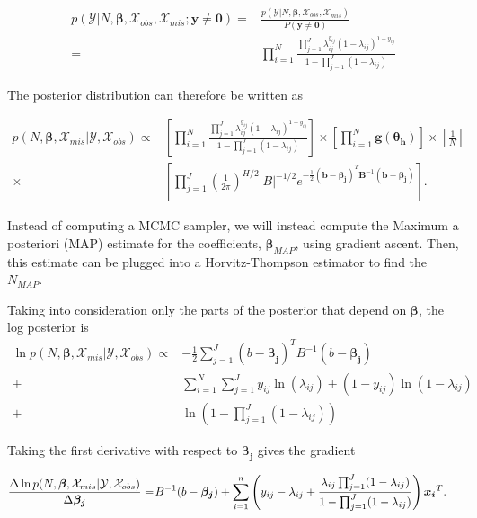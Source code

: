 \documentclass[
  12pt,
]{article}
\begin{document}
\begin{align}
\nonumber p(\mathcal{Y}|N,\boldsymbol{\beta},\mathcal{X}_{obs},\mathcal{X}_{mis};\boldsymbol{y}\ne \boldsymbol{0}) = & \frac{p(\mathcal{Y}|N,\boldsymbol{\beta},\mathcal{X}_{obs},\mathcal{X}_{mis})}{P(\boldsymbol{y}\ne \boldsymbol{0})} \\
= & \prod_{i=1}^N \frac{\prod_{j=1}^J \lambda_{ij}^{y_{ij}}(1-\lambda_{ij})^{1-y_{ij}}}{1-\prod_{j=1}^J(1-\lambda_{ij})}
\end{align}

The posterior distribution can therefore be written as

\begin{align}
\label{eqn:condposteriorderivevalues}
\nonumber p(N,\boldsymbol{\beta},\mathcal{X}_{mis}|\mathcal{Y},\mathcal{X}_{obs}) \propto &  \left[\prod_{i=1}^N \frac{\prod_{j=1}^J \lambda_{ij}^{y_{ij}}(1-\lambda_{ij})^{1-y_{ij}}}{1-\prod_{j=1}^J(1-\lambda_{ij})} \right] \times \left[ \prod_{i=1}^N \boldsymbol{g}(\boldsymbol{\theta_h}) \right] \times  \left[\frac{1}{N}\right] \\
\times & \left[ \prod_{j=1}^J \left(\frac{1}{2\pi}\right)^{H/2}|B|^{-1/2}e^{-\frac{1}{2}(\boldsymbol{b}-\boldsymbol{\beta_j})^T\boldsymbol{B}^{-1}(\boldsymbol{b}-\boldsymbol{\beta_j})}\right].
\end{align}

Instead of computing a MCMC sampler, we will instead compute the Maximum
a posteriori (MAP) estimate for the coefficients,
\(\boldsymbol{\beta}_{MAP}\), using gradient ascent. Then, this estimate
can be plugged into a Horvitz-Thompson estimator to find the
\(N_{MAP}\).

Taking into consideration only the parts of the posterior that depend on
\(\boldsymbol{\beta}\), the log posterior is \begin{align}
\nonumber \ln p(N,\boldsymbol{\beta},\mathcal{X}_{mis}|\mathcal{Y},\mathcal{X}_{obs}) \propto & -\frac{1}{2}\sum_{j=1}^J (b-\boldsymbol{\beta_j})^T B^{-1}(b-\boldsymbol{\beta_j}) \\
\nonumber + & \sum_{i=1}^N \sum_{j=1}^J y_{ij}\ln(\lambda_{ij}) + (1-y_{ij})\ln(1-\lambda_{ij}) \\ 
+  & \ln(1-\prod_{j=1}^J(1-\lambda_{ij}))
\end{align}

Taking the first derivative with respect to \(\boldsymbol{\beta_j}\)
gives the gradient

\begin{align}
\frac{\Delta \ln p(N,\boldsymbol{\beta},\mathcal{X}_{mis}|\mathcal{Y},\mathcal{X}_{obs})}{\Delta \boldsymbol{\beta_j}} = & \hspace{1px} B^{-1}(b-\boldsymbol{\beta_j}) + \sum_{i=1}^n \left(y_{ij}-\lambda_{ij}+\frac{\lambda_{ij}\prod_{j=1}^J(1-\lambda_{ij})}{1-\prod_{j=1}^J(1-\lambda_{ij})} \right)\boldsymbol{x_i}^T.
\end{align}
\end{document}
